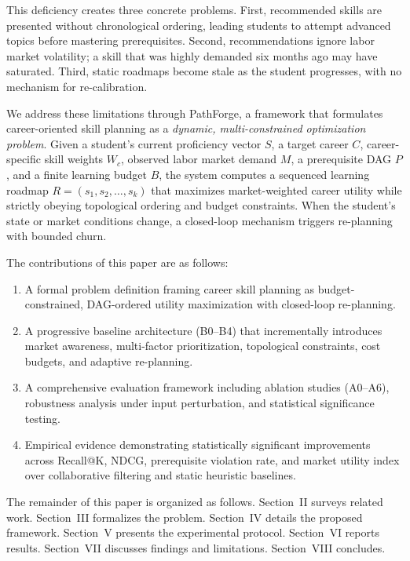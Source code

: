 \documentclass[conference]{IEEEtran}
\begin{document}
This deficiency creates three concrete problems. First, recommended skills are presented without chronological ordering, leading students to attempt advanced topics before mastering prerequisites. Second, recommendations ignore labor market volatility; a skill that was highly demanded six months ago may have saturated. Third, static roadmaps become stale as the student progresses, with no mechanism for re-calibration.

We address these limitations through PathForge, a framework that formulates career-oriented skill planning as a \emph{dynamic, multi-constrained optimization problem}. Given a student's current proficiency vector $S$, a target career $C$, career-specific skill weights $W_c$, observed labor market demand $M$, a prerequisite DAG $P$, and a finite learning budget $B$, the system computes a sequenced learning roadmap $R = (s_1, s_2, \dots, s_k)$ that maximizes market-weighted career utility while strictly obeying topological ordering and budget constraints. When the student's state or market conditions change, a closed-loop mechanism triggers re-planning with bounded churn.

The contributions of this paper are as follows:

\begin{enumerate}
    \item A formal problem definition framing career skill planning as budget-constrained, DAG-ordered utility maximization with closed-loop re-planning.
    \item A progressive baseline architecture (B0--B4) that incrementally introduces market awareness, multi-factor prioritization, topological constraints, cost budgets, and adaptive re-planning.
    \item A comprehensive evaluation framework including ablation studies (A0--A6), robustness analysis under input perturbation, and statistical significance testing.
    \item Empirical evidence demonstrating statistically significant improvements across Recall@K, NDCG, prerequisite violation rate, and market utility index over collaborative filtering and static heuristic baselines.
\end{enumerate}

The remainder of this paper is organized as follows. Section~II surveys related work. Section~III formalizes the problem. Section~IV details the proposed framework. Section~V presents the experimental protocol. Section~VI reports results. Section~VII discusses findings and limitations. Section~VIII concludes.
\end{document}

